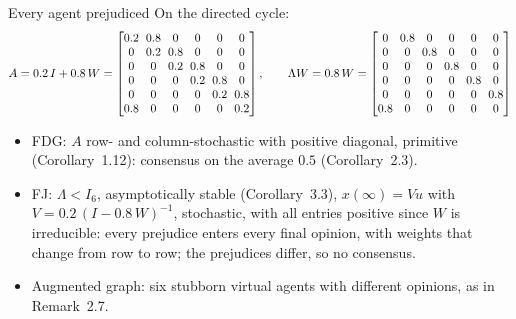 \begin{frame}[label=bk-all-prej]{Every agent prejudiced}
  \small
  On the directed cycle:
  \[
    {\setlength{\arraycolsep}{3pt}
    A = 0.2\, I + 0.8\, W = \begin{bmatrix}
       0.2&0.8&0&0&0&0\\ 0&0.2&0.8&0&0&0\\ 0&0&0.2&0.8&0&0\\ 0&0&0&0.2&0.8&0\\
       0&0&0&0&0.2&0.8\\ 0.8&0&0&0&0&0.2
    \end{bmatrix},
    \qquad
    \Lambda W = 0.8\, W = \begin{bmatrix}
       0&0.8&0&0&0&0\\ 0&0&0.8&0&0&0\\ 0&0&0&0.8&0&0\\ 0&0&0&0&0.8&0\\
       0&0&0&0&0&0.8\\ 0.8&0&0&0&0&0
    \end{bmatrix}}
  \]
  \begin{itemize}
    \item FDG: $A$ row- and column-stochastic with positive diagonal, primitive
          (Corollary~1.12): consensus on the average $0.5$ (Corollary~2.3).
    \item FJ: $\Lambda < I_6$, asymptotically stable (Corollary~3.3),
          $x(\infty) = Vu$ with $V = 0.2\,(I - 0.8\,W)^{-1}$, stochastic, with all entries
          positive since $W$ is irreducible: every prejudice enters every final opinion,
          with weights that change from row to row; the prejudices differ, so no consensus.
    \item Augmented graph: six stubborn virtual agents with different opinions, as in
          Remark~2.7.
  \end{itemize}
\end{frame}

